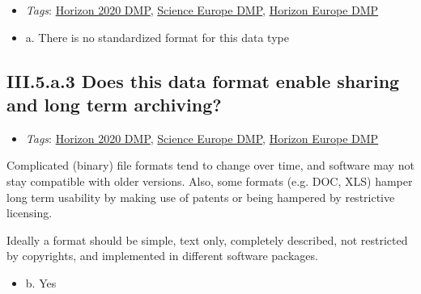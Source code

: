 \documentclass[a4paper,12pt]{report}
\begin{document}
\begin{itemize}
  \item \textit{Tags}: \ul{Horizon 2020 DMP}, \ul{Science Europe DMP}, \ul{Horizon Europe DMP}
  \end{itemize}




\begin{itemize}
  \item[\CheckmarkBold] a. There is no standardized format for this data type
\end{itemize}





\subsection*{\protect\textcolor{colorSecId}{III.5.a.3} Does this data format enable sharing and long term archiving?}

\label{b1df3c74-0b1f-4574-81c4-4cc2d780c1af.b08fe063-33f8-4380-b3a9-ba1e586dedf2.60574746-e0ce-44c6-8095-a4ed4ebf8d54.ced5a7c2-4034-4763-a1d5-3cb815cdfddb}


\begin{itemize}
  \item \textit{Tags}: \ul{Horizon 2020 DMP}, \ul{Science Europe DMP}, \ul{Horizon Europe DMP}
  \end{itemize}


\noindent
\begin{markdown}
Complicated (binary) file formats tend to change over time, and software may not stay compatible with older versions. Also, some formats (e.g. DOC, XLS) hamper long term usability by making use of patents or being hampered by restrictive licensing. 

Ideally a format should be simple, text only, completely described, not restricted by copyrights, and implemented in different software packages.
\end{markdown}



\begin{itemize}
  \item[\CheckmarkBold] b. Yes
\end{itemize}
\end{document}
